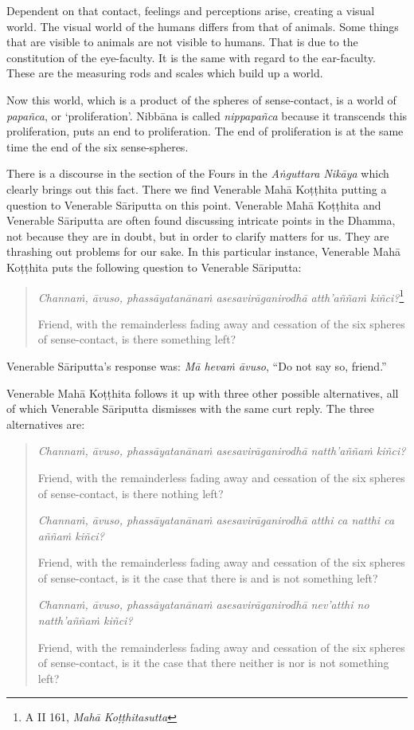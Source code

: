 Dependent on that contact, feelings and perceptions arise, creating a visual world. The visual world of the humans differs from that of animals. Some things that are visible to animals are not visible to humans. That is due to the constitution of the eye-faculty. It is the same with regard to the ear-faculty. These are the measuring rods and scales which build up a world.

Now this world, which is a product of the spheres of sense-contact, is a world of \emph{papañca}, or `proliferation'. Nibbāna is called \emph{nippapañca} because it transcends this proliferation, puts an end to proliferation. The end of proliferation is at the same time the end of the six sense-spheres.

There is a discourse in the section of the Fours in the \emph{Aṅguttara Nikāya} which clearly brings out this fact. There we find Venerable Mahā Koṭṭhita putting a question to Venerable Sāriputta on this point. Venerable Mahā Koṭṭhita and Venerable Sāriputta are often found discussing intricate points in the Dhamma, not because they are in doubt, but in order to clarify matters for us. They are thrashing out problems for our sake. In this particular instance, Venerable Mahā Koṭṭhita puts the following question to Venerable Sāriputta:

\begin{quote}
\emph{Channaṁ, āvuso, phassāyatanānaṁ asesavirāganirodhā atth'aññaṁ kiñci?}\footnote{A II 161, \emph{Mahā Koṭṭhitasutta}}

Friend, with the remainderless fading away and cessation of the six spheres of sense-contact, is there something left?
\end{quote}

Venerable Sāriputta's response was: \emph{Mā hevaṁ āvuso}, ``Do not say so, friend.''

Venerable Mahā Koṭṭhita follows it up with three other possible alternatives, all of which Venerable Sāriputta dismisses with the same curt reply. The three alternatives are:

\begin{quote}
\emph{Channaṁ, āvuso, phassāyatanānaṁ asesavirāganirodhā natth'aññaṁ kiñci?}

Friend, with the remainderless fading away and cessation of the six spheres of sense-contact, is there nothing left?

\emph{Channaṁ, āvuso, phassāyatanānaṁ asesavirāganirodhā atthi ca natthi ca aññaṁ kiñci?}

Friend, with the remainderless fading away and cessation of the six spheres of sense-contact, is it the case that there is and is not something left?

\emph{Channaṁ, āvuso, phassāyatanānaṁ asesavirāganirodhā nev'atthi no natth'aññaṁ kiñci?}

Friend, with the remainderless fading away and cessation of the six spheres of sense-contact, is it the case that there neither is nor is not something left?
\end{quote}


